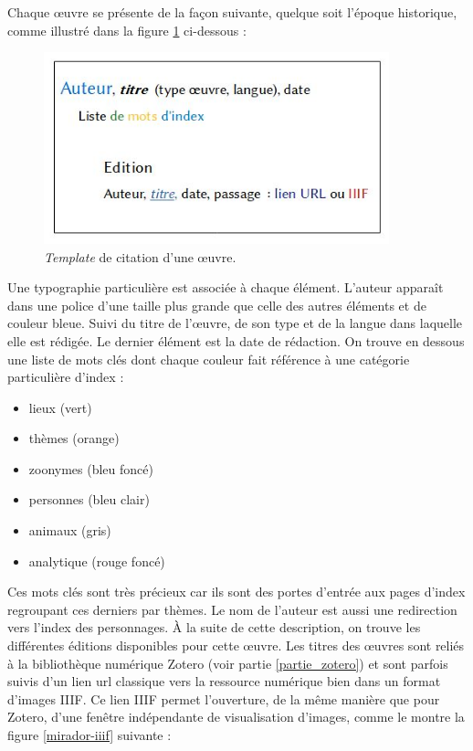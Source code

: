 \documentclass[a4paper,12pt,twoside]{book}
\begin{document}
Chaque \oe{}uvre se présente de la façon suivante, quelque soit l'époque historique, comme illustré dans la figure \ref{template} ci-dessous : 

\begin{figure}[H]
    \centering
    \includegraphics[width=10cm]{img/partie_3/template.JPG}
    \caption{\textit{Template} de citation d'une \oe{}uvre.}
    \label{template}
\end{figure}

Une typographie particulière est associée à chaque élément. L'auteur apparaît dans une police d'une taille plus grande que celle des autres éléments et de couleur bleue. Suivi du titre de l'\oe{}uvre, de son type et de la langue dans laquelle elle est rédigée. Le dernier élément est la date de rédaction. On trouve en dessous une liste de mots clés dont chaque couleur fait référence à une catégorie particulière d'index : 
\begin{itemize}
    \item lieux (vert)
    \item thèmes (orange)
    \item zoonymes (bleu foncé)
    \item personnes (bleu clair)
    \item animaux (gris)
    \item analytique (rouge foncé)
\end{itemize}
Ces mots clés sont très précieux car ils sont des portes d'entrée aux pages d'index regroupant ces derniers par thèmes. Le nom de l'auteur est aussi une redirection vers l'index des personnages. À la suite de cette description, on trouve les différentes éditions disponibles pour cette \oe{}uvre. Les titres des \oe{}uvres sont reliés à la bibliothèque numérique Zotero (voir partie \ref{partie_zotero}) et sont parfois suivis d'un lien url classique vers la ressource numérique bien dans un format d'images \acrshort{IIIF}. Ce lien \acrshort{IIIF} permet l'ouverture, de la même manière que pour Zotero, d'une fenêtre indépendante de visualisation d'images, comme le montre la figure \ref{mirador-iiif} suivante :
\end{document}
